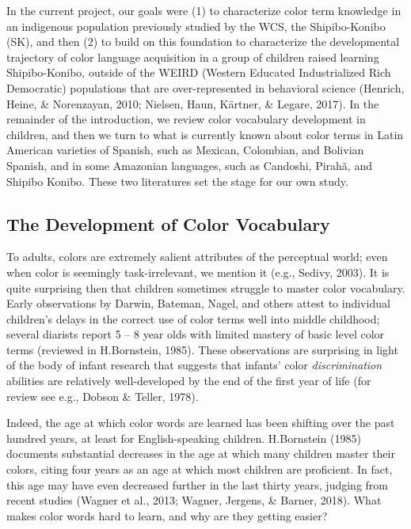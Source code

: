 \documentclass[
  english,
  ,man,floatsintext]{apa6}
\begin{document}
In the current project, our goals were (1) to characterize color term knowledge in an indigenous population previously studied by the WCS, the Shipibo-Konibo (SK), and then (2) to build on this foundation to characterize the developmental trajectory of color language acquisition in a group of children raised learning Shipibo-Konibo, outside of the WEIRD (Western Educated Industrialized Rich Democratic) populations that are over-represented in behavioral science (Henrich, Heine, \& Norenzayan, 2010; Nielsen, Haun, Kärtner, \& Legare, 2017). In the remainder of the introduction, we review color vocabulary development in children, and then we turn to what is currently known about color terms in Latin American varieties of Spanish, such as Mexican, Colombian, and Bolivian Spanish, and in some Amazonian languages, such as Candoshi, Pirahã, and Shipibo Konibo. These two literatures set the stage for our own study.

\hypertarget{the-development-of-color-vocabulary}{%
\subsection{The Development of Color Vocabulary}\label{the-development-of-color-vocabulary}}

To adults, colors are extremely salient attributes of the perceptual world; even when color is seemingly task-irrelevant, we mention it (e.g., Sedivy, 2003). It is quite surprising then that children sometimes struggle to master color vocabulary. Early observations by Darwin, Bateman, Nagel, and others attest to individual children's delays in the correct use of color terms well into middle childhood; several diarists report 5 -- 8 year olds with limited mastery of basic level color terms (reviewed in H.Bornstein, 1985). These observations are surprising in light of the body of infant research that suggests that infants' color \emph{discrimination} abilities are relatively well-developed by the end of the first year of life (for review see e.g., Dobson \& Teller, 1978).

Indeed, the age at which color words are learned has been shifting over the past hundred years, at least for English-speaking children. H.Bornstein (1985) documents substantial decreases in the age at which many children master their colors, citing four years as an age at which most children are proficient. In fact, this age may have even decreased further in the last thirty years, judging from recent studies (Wagner et al., 2013; Wagner, Jergens, \& Barner, 2018). What makes color words hard to learn, and why are they getting easier?
\end{document}
